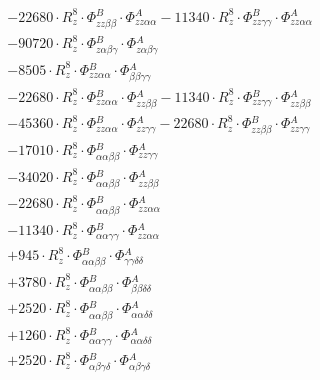 \documentclass{article}
\begin{document}
\begin{subequations}
\begin{gather}
\begin{array}{c}
 \\[0.2em] 		 - 22680 \cdot R_{z}^{8} \cdot \Phi{}^{B}_{zz\beta{}\beta{}} \cdot \Phi{}^{A}_{zz\alpha{}\alpha{}}- 11340 \cdot R_{z}^{8} \cdot \Phi{}^{B}_{zz\gamma{}\gamma{}} \cdot \Phi{}^{A}_{zz\alpha{}\alpha{}} 
 \\[0.2em] 		 - 90720 \cdot R_{z}^{8} \cdot \Phi{}^{B}_{z\alpha{}\beta{}\gamma{}} \cdot \Phi{}^{A}_{z\alpha{}\beta{}\gamma{}} 
 \\[0.2em] 		 - 8505 \cdot R_{z}^{8} \cdot \Phi{}^{B}_{zz\alpha{}\alpha{}} \cdot \Phi{}^{A}_{\beta{}\beta{}\gamma{}\gamma{}} 
 \\[0.2em] 		 - 22680 \cdot R_{z}^{8} \cdot \Phi{}^{B}_{zz\alpha{}\alpha{}} \cdot \Phi{}^{A}_{zz\beta{}\beta{}}- 11340 \cdot R_{z}^{8} \cdot \Phi{}^{B}_{zz\gamma{}\gamma{}} \cdot \Phi{}^{A}_{zz\beta{}\beta{}} 
 \\[0.2em] 		 - 45360 \cdot R_{z}^{8} \cdot \Phi{}^{B}_{zz\alpha{}\alpha{}} \cdot \Phi{}^{A}_{zz\gamma{}\gamma{}}- 22680 \cdot R_{z}^{8} \cdot \Phi{}^{B}_{zz\beta{}\beta{}} \cdot \Phi{}^{A}_{zz\gamma{}\gamma{}} 
 \\[0.2em] 		 - 17010 \cdot R_{z}^{8} \cdot \Phi{}^{B}_{\alpha{}\alpha{}\beta{}\beta{}} \cdot \Phi{}^{A}_{zz\gamma{}\gamma{}} 
 \\[0.2em] 		 - 34020 \cdot R_{z}^{8} \cdot \Phi{}^{B}_{\alpha{}\alpha{}\beta{}\beta{}} \cdot \Phi{}^{A}_{zz\beta{}\beta{}} 
 \\[0.2em] 		 - 22680 \cdot R_{z}^{8} \cdot \Phi{}^{B}_{\alpha{}\alpha{}\beta{}\beta{}} \cdot \Phi{}^{A}_{zz\alpha{}\alpha{}} 
 \\[0.2em] 		 - 11340 \cdot R_{z}^{8} \cdot \Phi{}^{B}_{\alpha{}\alpha{}\gamma{}\gamma{}} \cdot \Phi{}^{A}_{zz\alpha{}\alpha{}} 
 \\[0.2em] 		 + 945 \cdot R_{z}^{8} \cdot \Phi{}^{B}_{\alpha{}\alpha{}\beta{}\beta{}} \cdot \Phi{}^{A}_{\gamma{}\gamma{}\delta{}\delta{}} 
 \\[0.2em] 		 + 3780 \cdot R_{z}^{8} \cdot \Phi{}^{B}_{\alpha{}\alpha{}\beta{}\beta{}} \cdot \Phi{}^{A}_{\beta{}\beta{}\delta{}\delta{}} 
 \\[0.2em] 		 + 2520 \cdot R_{z}^{8} \cdot \Phi{}^{B}_{\alpha{}\alpha{}\beta{}\beta{}} \cdot \Phi{}^{A}_{\alpha{}\alpha{}\delta{}\delta{}} 
 \\[0.2em] 		 + 1260 \cdot R_{z}^{8} \cdot \Phi{}^{B}_{\alpha{}\alpha{}\gamma{}\gamma{}} \cdot \Phi{}^{A}_{\alpha{}\alpha{}\delta{}\delta{}} 
 \\[0.2em] 		 + 2520 \cdot R_{z}^{8} \cdot \Phi{}^{B}_{\alpha{}\beta{}\gamma{}\delta{}} \cdot \Phi{}^{A}_{\alpha{}\beta{}\gamma{}\delta{}}

\end{array}
\end{gather}
\end{subequations}
\end{document}
